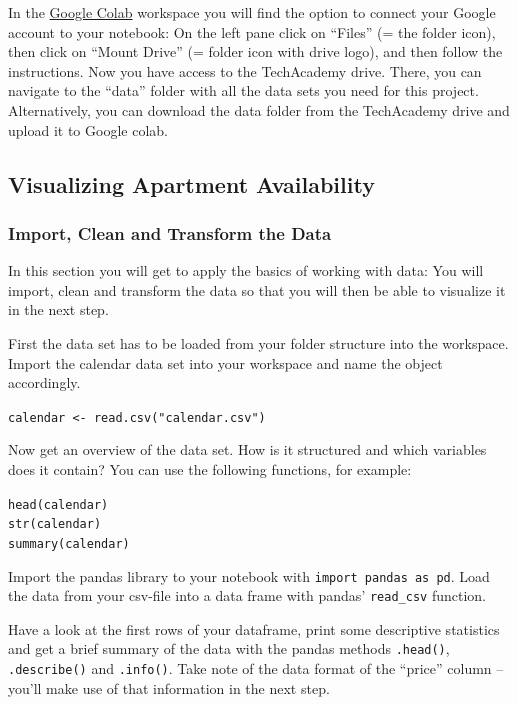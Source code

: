 \documentclass[
  11pt,
]{article}
\newenvironment{tips}[1]
  {
  \begin{itemize}
  \footnotesize
  \renewcommand{\labelitemi}{
    \raisebox{-.7\height}[0pt][0pt]{
      {\setkeys{Gin}{width=3em,keepaspectratio}
        \texttt{[image: images/\#1.png]}}
    }
  }
  \setlength{\fboxsep}{1em}
  \begin{rbox}
  \item
  }
  {
  \end{rbox}
  \end{itemize}
  }
\newenvironment{tipsp}[1]
  {
  \begin{itemize}
  \footnotesize
  \renewcommand{\labelitemi}{
    \raisebox{-.7\height}[0pt][0pt]{
      {\setkeys{Gin}{width=3em,keepaspectratio}
        \texttt{[image: images/\#1.png]}}
    }
  }
  \setlength{\fboxsep}{1em}
  \begin{pbox}
  \item
  }
  {
  \end{pbox}
  \end{itemize}
  }
\begin{document}
\begin{tipsp}p

In the \href{https://colab.research.google.com}{Google Colab} workspace you will find the option to connect your Google account to your notebook: On the left pane click on ``Files'' (= the folder icon), then click on ``Mount Drive'' (= folder icon with drive logo), and then follow the instructions.
Now you have access to the TechAcademy drive. There, you can navigate to the ``data'' folder with all the data sets you need for this project.
Alternatively, you can download the data folder from the TechAcademy drive and upload it to Google colab.

\end{tipsp}

\hypertarget{visualizing-apartment-availability}{%
\subsection{Visualizing Apartment Availability}\label{visualizing-apartment-availability}}

\hypertarget{import-clean-and-transform-the-data}{%
\subsubsection{Import, Clean and Transform the Data}\label{import-clean-and-transform-the-data}}

In this section you will get to apply the basics of working with data: You will import, clean and transform the data so that you will then be able to visualize it in the next step.

\begin{tips}r

First the data set has to be loaded from your folder structure into the workspace. Import the calendar data set into your workspace and name the object accordingly.

\texttt{calendar\ \textless{}-\ read.csv("calendar.csv")}

Now get an overview of the data set. How is it structured and which variables does it contain? You can use the following functions, for example:

\texttt{head(calendar)}~\\
\texttt{str(calendar)}~\\
\texttt{summary(calendar)}

\end{tips}

\begin{tipsp}p

Import the pandas library to your notebook with \texttt{import\ pandas\ as\ pd}. Load the data from your csv-file into a data frame with pandas' \texttt{read\_csv} function.

Have a look at the first rows of your dataframe, print some descriptive statistics and get a brief summary of the data with the pandas methods \texttt{.head()}, \texttt{.describe()} and \texttt{.info()}.
Take note of the data format of the ``price'' column -- you'll make use of that information in the next step.

\end{tipsp}
\end{document}
